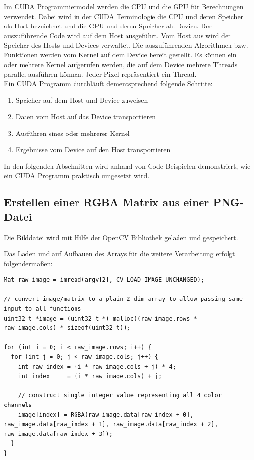 \documentclass{llncs}
\begin{document}
Im CUDA Programmiermodel werden die CPU und die GPU für Berechnungen verwendet. Dabei wird in der CUDA Terminologie die CPU und deren Speicher als Host bezeichnet und die GPU und deren Speicher als Device. Der auszuführende Code wird auf dem Host ausgeführt. Vom Host aus wird der Speicher des Hosts und Devices verwaltet. Die auszuführenden Algorithmen bzw. Funktionen werden vom Kernel auf dem Device bereit gestellt. Es können ein oder mehrere Kernel aufgerufen werden, die auf dem Device mehrere Threads parallel ausführen können. Jeder Pixel repräsentiert ein Thread.\\
\newpage
Ein CUDA Programm durchläuft dementsprechend folgende Schritte:
\begin{enumerate}
	\item Speicher auf dem Host und Device zuweisen
	\item Daten vom Host auf das Device transportieren
	\item Ausführen eines oder mehrerer Kernel
	\item Ergebnisse vom Device auf den Host transportieren
\end{enumerate}

In den folgenden Abschnitten wird anhand von Code Beispielen demonstriert, wie ein CUDA Programm praktisch umgesetzt wird.\\

%
\subsection{Erstellen einer RGBA Matrix aus einer PNG-Datei}
%
Die Bilddatei wird mit Hilfe der OpenCV Bibliothek geladen und gespeichert.

Das Laden und auf Aufbauen des Arrays für die weitere Verarbeitung erfolgt folgendermaßen:

\begin{lstlisting}
Mat raw_image = imread(argv[2], CV_LOAD_IMAGE_UNCHANGED);

// convert image/matrix to a plain 2-dim array to allow passing same input to all functions
uint32_t *image = (uint32_t *) malloc((raw_image.rows * raw_image.cols) * sizeof(uint32_t));

for (int i = 0; i < raw_image.rows; i++) {
  for (int j = 0; j < raw_image.cols; j++) {
    int raw_index = (i * raw_image.cols + j) * 4;
    int index     = (i * raw_image.cols) + j;

    // construct single integer value representing all 4 color channels
    image[index] = RGBA(raw_image.data[raw_index + 0], raw_image.data[raw_index + 1], raw_image.data[raw_index + 2], raw_image.data[raw_index + 3]);
  }
}
\end{lstlisting}
\newpage
%
\end{document}
